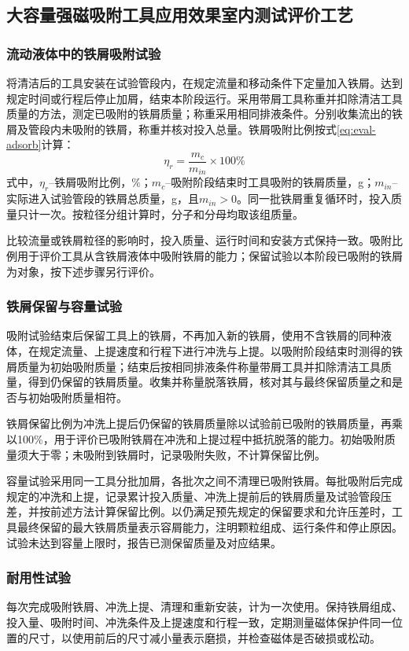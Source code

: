 \subsection{大容量强磁吸附工具应用效果室内测试评价工艺}
\label{sec:eval-mag}

\subsubsection{流动液体中的铁屑吸附试验}
将清洁后的工具安装在试验管段内，在规定流量和移动条件下定量加入铁屑。达到规定时间或行程后停止加屑，结束本阶段运行。采用带屑工具称重并扣除清洁工具质量的方法，测定已吸附的铁屑质量；称重采用相同排液条件。分别收集流出的铁屑及管段内未吸附的铁屑，称重并核对投入总量。铁屑吸附比例按式\eqref{eq:eval-adsorb}计算：
\begin{equation}
	\eta_r=\frac{m_c}{m_{in}}\times 100\%
	\label{eq:eval-adsorb}
\end{equation}
式中，$\eta_r$--铁屑吸附比例，\%；$m_c$--吸附阶段结束时工具吸附的铁屑质量，g；$m_{in}$--实际进入试验管段的铁屑总质量，g，且$m_{in}>0$。同一批铁屑重复循环时，投入质量只计一次。按粒径分组计算时，分子和分母均取该组质量。

比较流量或铁屑粒径的影响时，投入质量、运行时间和安装方式保持一致。吸附比例用于评价工具从含铁屑液体中吸附铁屑的能力；保留试验以本阶段已吸附的铁屑为对象，按下述步骤另行评价。

\subsubsection{铁屑保留与容量试验}
吸附试验结束后保留工具上的铁屑，不再加入新的铁屑，使用不含铁屑的同种液体，在规定流量、上提速度和行程下进行冲洗与上提。以吸附阶段结束时测得的铁屑质量为初始吸附质量；结束后按相同排液条件称量带屑工具并扣除清洁工具质量，得到仍保留的铁屑质量。收集并称量脱落铁屑，核对其与最终保留质量之和是否与初始吸附质量相符。

铁屑保留比例为冲洗上提后仍保留的铁屑质量除以试验前已吸附的铁屑质量，再乘以100\%，用于评价已吸附铁屑在冲洗和上提过程中抵抗脱落的能力。初始吸附质量须大于零；未吸附到铁屑时，记录吸附失败，不计算保留比例。

容量试验采用同一工具分批加屑，各批次之间不清理已吸附铁屑。每批吸附后完成规定的冲洗和上提，记录累计投入质量、冲洗上提前后的铁屑质量及试验管段压差，并按前述方法计算保留比例。以仍满足预先规定的保留要求和允许压差时，工具最终保留的最大铁屑质量表示容屑能力，注明颗粒组成、运行条件和停止原因。试验未达到容量上限时，报告已测保留质量及对应结果。

\subsubsection{耐用性试验}
每次完成吸附铁屑、冲洗上提、清理和重新安装，计为一次使用。保持铁屑组成、投入量、吸附时间、冲洗条件及上提速度和行程一致，定期测量磁体保护件同一位置的尺寸，以使用前后的尺寸减小量表示磨损，并检查磁体是否破损或松动。

